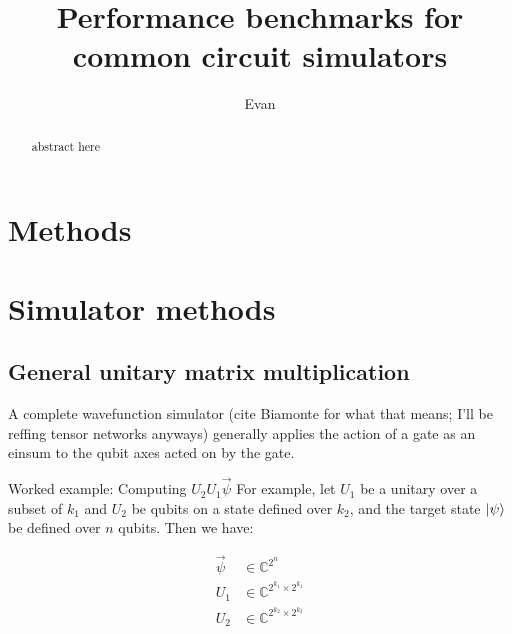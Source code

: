 \documentclass{article}
\title{Performance benchmarks for common circuit simulators}
\author{Evan}
\begin{document}
\maketitle

\begin{abstract}
	abstract here 
\end{abstract}


\newpage
\tableofcontents
\newpage



\section{Methods}
\section{Simulator methods}

\subsection{General unitary matrix multiplication}
\label{sec:fallback3}
A complete wavefunction simulator (cite Biamonte for what that means; I'll be reffing tensor networks anyways) generally applies the action of a gate as an einsum to the qubit axes acted on by the gate.

Worked example: Computing $U_2 U_1 \vec{\psi}$
For example, let $U_1$ be a unitary over a subset of $k_1$ and $U_2$ be qubits on a state defined over $k_2$, and the target state $\ket{\psi}$ be defined over $n$ qubits. Then we have:

\begin{align}
	 \vec{\psi} &\in \mathbb{C}^{2^n} \\
	 U_1 &\in \mathbb{C}^{2^{k_1} \times 2^{k_1}} \\
	 U_2 &\in \mathbb{C}^{2^{k_2} \times 2^{k_2}} \\
\end{align}
\end{document}
